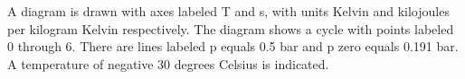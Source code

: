 A diagram is drawn with axes labeled T and s, with units Kelvin and kilojoules per kilogram Kelvin respectively. The diagram shows a cycle with points labeled 0 through 6. There are lines labeled p equals 0.5 bar and p zero equals 0.191 bar. A temperature of negative 30 degrees Celsius is indicated.
